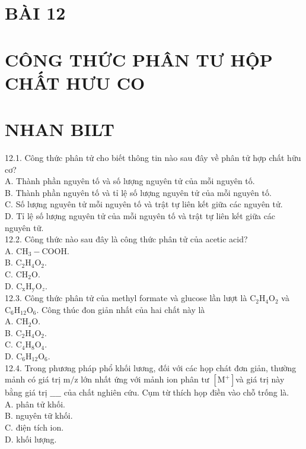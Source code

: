 \documentclass[10pt]{article}
\begin{document}
\section*{BÀI 12}
\section*{CÔNG THỨC PHÂN TƯ HỘP CHẤT HƯU CO}
\section*{NHAN BILT}
12.1. Công thức phân tử cho biết thông tin nào sau đây về phân tử hợp chất hữu cơ?\\
A. Thành phần nguyên tố và số lượng nguyên tử của mỗi nguyên tố.\\
B. Thành phần nguyên tố và tỉ lệ số lượng nguyên tử của mỗi nguyên tố.\\
C. Số lượng nguyên tử mỗi nguyên tố và trật tự liên kết giữa các nguyên tử.\\
D. Tỉ lệ số lượng nguyên tử của mỗi nguyên tố và trật tự liên kết giữa các nguyên tữ.\\
12.2. Công thức nào sau đây là công thức phân tử của acetic acid?\\
A. $\mathrm{CH}_{3}-\mathrm{COOH}$.\\
B. $\mathrm{C}_{2} \mathrm{H}_{4} \mathrm{O}_{2}$.\\
C. $\mathrm{CH}_{2} \mathrm{O}$.\\
D. $\mathrm{C}_{\mathrm{x}} \mathrm{H}_{\mathrm{y}} \mathrm{O}_{z}$.\\
12.3. Công thức phân tử của methyl formate và glucose lần lượt là $\mathrm{C}_{2} \mathrm{H}_{4} \mathrm{O}_{2}$ và $\mathrm{C}_{6} \mathrm{H}_{12} \mathrm{O}_{6}$. Công thúc đon giản nhất của hai chất này là\\
A. $\mathrm{CH}_{2} \mathrm{O}$.\\
B. $\mathrm{C}_{2} \mathrm{H}_{4} \mathrm{O}_{2}$.\\
C. $\mathrm{C}_{4} \mathrm{H}_{8} \mathrm{O}_{4}$.\\
D. $\mathrm{C}_{6} \mathrm{H}_{12} \mathrm{O}_{6}$.\\
12.4. Trong phương pháp phổ khối lương, đối với các họp chát đơn giản, thường mảnh có giá trị $\mathrm{m} / \mathrm{z}$ lớn nhất ứng với mảnh ion phân tư $\left[\mathrm{M}^{+}\right]$và giá trị này bằng giá trị $\_\_\_\_$ của chất nghiên cứu. Cụm từ thích họp điền vào chỗ trống là.\\
A. phân tử khối.\\
B. nguyên tữ khối.\\
C. điện tích ion.\\
D. khối lượng.
\end{document}
